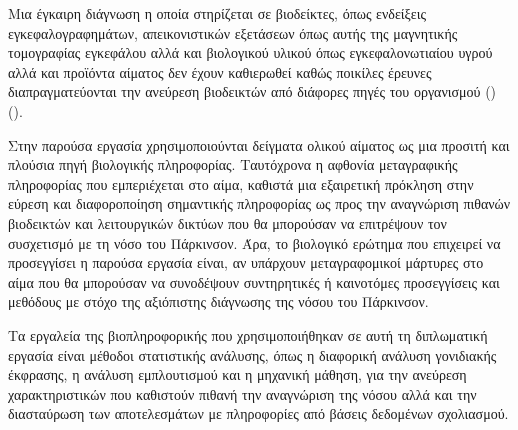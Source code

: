 \documentclass[12pt]{report}
\begin{document}
    \par
        Μια έγκαιρη διάγνωση η οποία στηρίζεται σε βιοδείκτες, όπως ενδείξεις εγκεφαλογραφημάτων, απεικονιστικών εξετάσεων όπως αυτής της μαγνητικής τομογραφίας εγκεφάλου αλλά και βιολογικού υλικού όπως εγκεφαλονωτιαίου υγρού αλλά και προϊόντα αίματος δεν έχουν καθιερωθεί καθώς ποικίλες έρευνες διαπραγματεύονται την ανεύρεση βιοδεικτών από διάφορες πηγές του οργανισμού (\emph{\cite{Miller2015BiomarkersFuture}}) (\emph{\cite{Maitin2022SurveyReview}}).
    \par
        Στην παρούσα εργασία χρησιμοποιούνται δείγματα ολικού αίματος ως μια προσιτή και πλούσια πηγή βιολογικής πληροφορίας. Ταυτόχρονα η αφθονία μεταγραφικής πληροφορίας που εμπεριέχεται στο αίμα, καθιστά μια εξαιρετική πρόκληση στην εύρεση και διαφοροποίηση σημαντικής πληροφορίας ως προς την αναγνώριση πιθανών βιοδεικτών και λειτουργικών δικτύων που θα μπορούσαν να επιτρέψουν τον συσχετισμό με τη νόσο του Πάρκινσον. Άρα, το βιολογικό ερώτημα που επιχειρεί να προσεγγίσει η παρούσα εργασία είναι, αν υπάρχουν μεταγραφομικοί μάρτυρες στο αίμα που θα μπορούσαν να συνοδέψουν συντηρητικές ή καινοτόμες προσεγγίσεις και μεθόδους με στόχο της αξιόπιστης διάγνωσης της νόσου του Πάρκινσον.
    \par
        Τα εργαλεία της βιοπληροφορικής που χρησιμοποιήθηκαν σε αυτή τη διπλωματική εργασία είναι μέθοδοι στατιστικής ανάλυσης, όπως η διαφορική ανάλυση γονιδιακής έκφρασης, η ανάλυση εμπλουτισμού και η μηχανική μάθηση, για την ανεύρεση χαρακτηριστικών που καθιστούν πιθανή την αναγνώριση της νόσου αλλά και την διασταύρωση των αποτελεσμάτων με πληροφορίες από βάσεις δεδομένων σχολιασμού.
        
    \cleardoublepage
\end{document}
